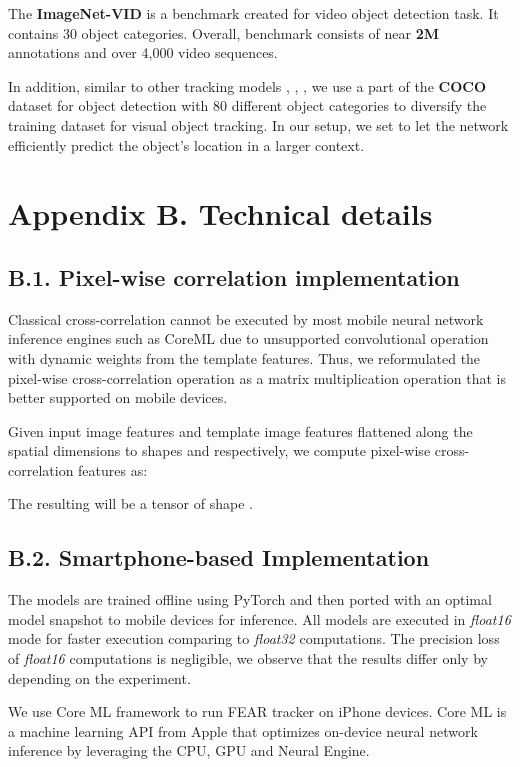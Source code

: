 \documentclass[runningheads]{llncs}
\begin{document}
The \textbf{ImageNet-VID} \cite{ImageNet} is a benchmark created for video object detection task. It contains 30 object categories. 
Overall, benchmark consists of near \textbf{2M} annotations and over 4,000 video sequences.

In addition, similar to other tracking models \cite{SiamFC}, \cite{DaSiamRPN}, \cite{Ocean}, we use a part of the \textbf{COCO} \cite{COCO} dataset for object detection with 80 different object categories to diversify the training dataset for visual object tracking. In our setup, we set  to let the network efficiently predict the object's location in a larger context.

\section*{Appendix B. Technical details}
\subsection*{B.1. Pixel-wise correlation implementation}
Classical cross-correlation cannot be executed by most mobile neural network inference engines such as CoreML \cite{coreml} due to unsupported convolutional operation with dynamic weights from the template features. 
Thus, we reformulated the pixel-wise cross-correlation operation as a matrix multiplication operation that is better supported on mobile devices. 

Given input image features  and template image features  flattened along the spatial dimensions to shapes  and  respectively, we compute pixel-wise cross-correlation features  as:

The resulting  will be a tensor of shape .

\subsection*{B.2. Smartphone-based Implementation} The models are trained offline using PyTorch \cite{pytorch} and then ported with an optimal model snapshot to mobile devices for inference. All models are executed in \textit{float16} mode for faster execution comparing to \textit{float32} computations. The precision loss of \textit{float16} computations is negligible, we observe that the results differ only by  depending on the experiment. 

We use Core ML \cite{coreml} framework to run FEAR tracker on iPhone devices. Core ML is a machine learning API from Apple that optimizes on-device neural network inference by leveraging the CPU, GPU and Neural Engine. 
\end{document}

